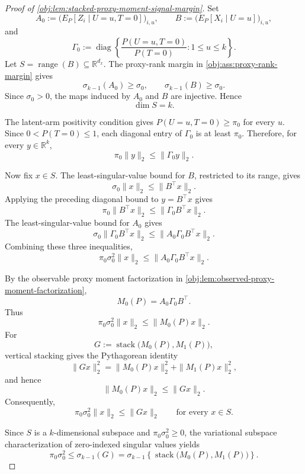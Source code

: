 \begin{proof}[Proof of \cref{obj:lem:stacked-proxy-moment-signal-margin}]
Set
\[
A_0:=\bigl(E_P[Z_i\mid U=u,T=0]\bigr)_{i,u},\qquad
B:=\bigl(E_P[X_i\mid U=u]\bigr)_{i,u},
\]
and
\[
\Gamma_0:=
\operatorname{diag}\left\{
\frac{P(U=u,T=0)}{P(T=0)}:1\le u\le k
\right\}.
\]
Let \(S=\operatorname{range}(B)\subseteq\mathbb R^{d_x}\).  The proxy-rank margin in
\cref{obj:ass:proxy-rank-margin} gives
\[
\sigma_{k-1}(A_0)\ge \sigma_0,\qquad
\sigma_{k-1}(B)\ge \sigma_0 .
\]
Since \(\sigma_0>0\), the maps induced by \(A_0\) and \(B\) are injective.  Hence
\[
\dim S=k .
\]

The latent-arm positivity condition gives \(P(U=u,T=0)\ge \pi_0\) for every \(u\).  Since
\(0<P(T=0)\le1\), each diagonal entry of \(\Gamma_0\) is at least \(\pi_0\).  Therefore, for every
\(y\in\mathbb R^k\),
\[
\pi_0\|y\|_2\le \|\Gamma_0y\|_2 .
\]

Now fix \(x\in S\).  The least-singular-value bound for \(B\), restricted to its range, gives
\[
\sigma_0\|x\|_2\le \|B^\top x\|_2 .
\]
Applying the preceding diagonal bound to \(y=B^\top x\) gives
\[
\pi_0\|B^\top x\|_2\le \|\Gamma_0B^\top x\|_2 .
\]
The least-singular-value bound for \(A_0\) gives
\[
\sigma_0\|\Gamma_0B^\top x\|_2
\le
\|A_0\Gamma_0B^\top x\|_2 .
\]
Combining these three inequalities,
\[
\pi_0\sigma_0^2\|x\|_2
\le
\|A_0\Gamma_0B^\top x\|_2 .
\]

By the observable proxy moment factorization in
\cref{obj:lem:observed-proxy-moment-factorization},
\[
M_0(P)=A_0\Gamma_0B^\top .
\]
Thus
\[
\pi_0\sigma_0^2\|x\|_2
\le
\|M_0(P)x\|_2 .
\]
For
\[
G:=\operatorname{stack}\bigl(M_0(P),M_1(P)\bigr),
\]
vertical stacking gives the Pythagorean identity
\[
\|Gx\|_2^2=\|M_0(P)x\|_2^2+\|M_1(P)x\|_2^2,
\]
and hence
\[
\|M_0(P)x\|_2\le \|Gx\|_2 .
\]
Consequently,
\[
\pi_0\sigma_0^2\|x\|_2\le \|Gx\|_2
\qquad\text{for every }x\in S .
\]

Since \(S\) is a \(k\)-dimensional subspace and \(\pi_0\sigma_0^2\ge0\), the variational
subspace characterization of zero-indexed singular values yields
\[
\pi_0\sigma_0^2
\le
\sigma_{k-1}(G)
=
\sigma_{k-1}\!\left\{\operatorname{stack}\bigl(M_0(P),M_1(P)\bigr)\right\}.
\]
\end{proof}

